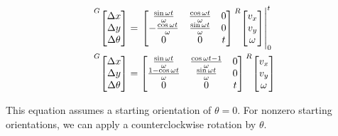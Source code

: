 \begin{align*}
  \prescript{G}{}{\begin{bmatrix}
    \Delta x \\
    \Delta y \\
    \Delta \theta
  \end{bmatrix}} &=
  \left.\begin{bmatrix}
     \frac{\sin\omega t}{\omega} & \frac{\cos\omega t}{\omega} & 0 \\
    -\frac{\cos\omega t}{\omega} & \frac{\sin\omega t}{\omega} & 0 \\
    0 & 0 & t
  \end{bmatrix}
  \prescript{R}{}{\begin{bmatrix}
    v_x \\
    v_y \\
    \omega
  \end{bmatrix}} \right|_0^t \\
  \prescript{G}{}{\begin{bmatrix}
    \Delta x \\
    \Delta y \\
    \Delta \theta
  \end{bmatrix}} &=
  \begin{bmatrix}
    \frac{\sin\omega t}{\omega} & \frac{\cos\omega t - 1}{\omega} & 0 \\
    \frac{1 - \cos\omega t}{\omega} & \frac{\sin\omega t}{\omega} & 0 \\
    0 & 0 & t
  \end{bmatrix}
  \prescript{R}{}{\begin{bmatrix}
    v_x \\
    v_y \\
    \omega
  \end{bmatrix}}
\end{align*}

This equation assumes a starting orientation of $\theta = 0$. For nonzero
starting orientations, we can apply a counterclockwise rotation by $\theta$.

